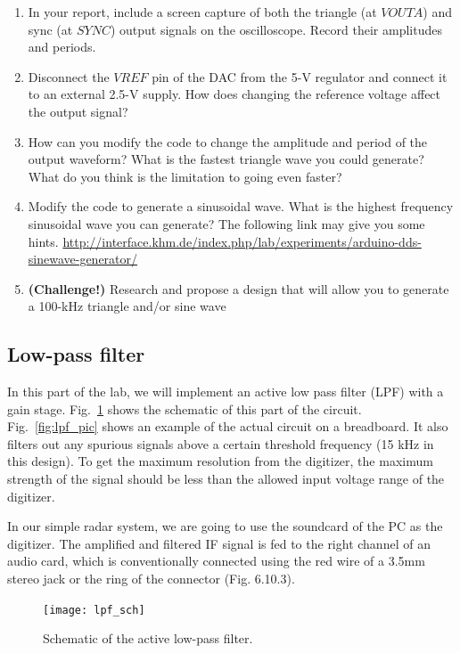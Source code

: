 \documentclass[letterpaper, 11pt]{article}
\begin{document}
\begin{enumerate}
\item In your report, include a screen capture of both the triangle (at $VOUTA$) and sync (at $SYNC$) output signals on the oscilloscope. Record their amplitudes and periods.

\item Disconnect the $VREF$ pin of the DAC from the 5-V regulator and connect it to an external 2.5-V supply. How does changing the reference voltage affect the output signal?

\item How can you modify the code to change the amplitude and period of the output waveform? What is the fastest triangle wave you could generate? What do you think is the limitation to going even faster?

\item Modify the code to generate a sinusoidal wave. What is the highest frequency sinusoidal wave you can generate? The following link may give you some hints. 
\url{http://interface.khm.de/index.php/lab/experiments/arduino-dds-sinewave-generator/} 

\item \textbf{(Challenge!)} Research and propose a design that will allow you to generate a 100-kHz triangle and/or sine wave

\end{enumerate}

\subsection{Low-pass filter}

In this part of the lab, we will implement an active low pass filter (LPF) with a gain stage. Fig.~\ref{fig:lpf_sch} shows the schematic of this part of the circuit. Fig.~\ref{fig:lpf_pic} shows an example of the actual circuit on a breadboard. It also filters out any spurious signals above a certain threshold frequency (15 kHz in this design). To get the maximum resolution from the digitizer, the maximum strength of the signal should be less than the allowed input voltage range of the digitizer. 

In our simple radar system, we are going to use the soundcard of the PC as the digitizer. The amplified and filtered IF signal is fed to the right channel of an audio card, which is conventionally connected using the red wire of a 3.5mm stereo jack or the ring of the connector (Fig. 6.10.3). 

\begin{figure}[h]
	\centering
	\texttt{[image: lpf\_sch]}
	\caption{Schematic of the active low-pass filter.}
	\label{fig:lpf_sch}
\end{figure}
\end{document}
